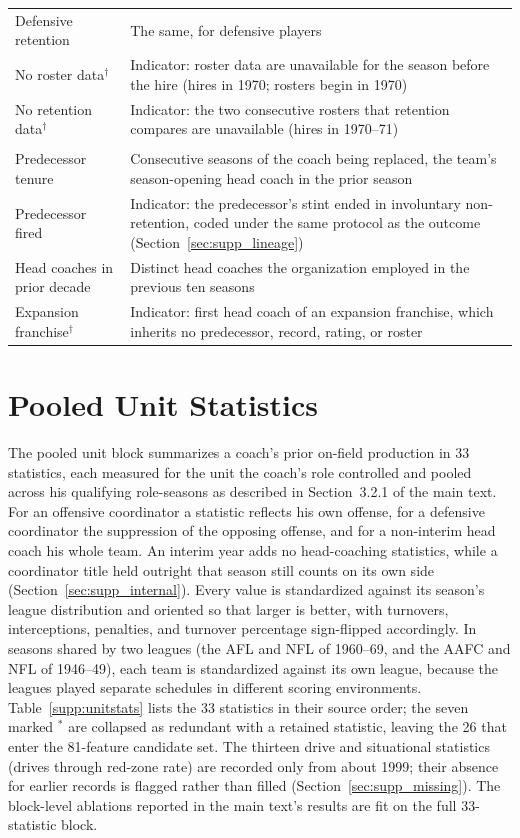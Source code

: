 \documentclass[12pt,USenglish]{article}
\begin{document}
{\begin{longtable}{@{}l p{8.8cm}@{}}
Defensive retention & The same, for defensive players \\
No roster data$^{\dagger}$ & Indicator: roster data are unavailable for the season before the hire (hires in 1970; rosters begin in 1970) \\
No retention data$^{\dagger}$ & Indicator: the two consecutive rosters that retention compares are unavailable (hires in 1970--71) \\
\addlinespace
\multicolumn{2}{@{}l}{\emph{Organizational instability (4)}}\\[2pt]
Predecessor tenure & Consecutive seasons of the coach being replaced, the team's season-opening head coach in the prior season \\
Predecessor fired & Indicator: the predecessor's stint ended in involuntary non-retention, coded under the same protocol as the outcome (Section~\ref{sec:supp_lineage}) \\
Head coaches in prior decade & Distinct head coaches the organization employed in the previous ten seasons \\
Expansion franchise$^{\dagger}$ & Indicator: first head coach of an expansion franchise, which inherits no predecessor, record, rating, or roster \\
\end{longtable}
}

\section{Pooled Unit Statistics}
\label{sec:supp_unitstats}

The pooled unit block summarizes a coach's prior on-field production in 33 statistics, each measured for the unit the coach's role controlled and pooled across his qualifying role-seasons as described in Section~3.2.1 of the main text. For an offensive coordinator a statistic reflects his own offense, for a defensive coordinator the suppression of the opposing offense, and for a non-interim head coach his whole team. An interim year adds no head-coaching statistics, while a coordinator title held outright that season still counts on its own side (Section~\ref{sec:supp_internal}). Every value is standardized against its season's league distribution and oriented so that larger is better, with turnovers, interceptions, penalties, and turnover percentage sign-flipped accordingly. In seasons shared by two leagues (the AFL and NFL of 1960--69, and the AAFC and NFL of 1946--49), each team is standardized against its own league, because the leagues played separate schedules in different scoring environments. Table~\ref{supp:unitstats} lists the 33 statistics in their source order; the seven marked $^{\ast}$ are collapsed as redundant with a retained statistic, leaving the 26 that enter the 81-feature candidate set. The thirteen drive and situational statistics (drives through red-zone rate) are recorded only from about 1999; their absence for earlier records is flagged rather than filled (Section~\ref{sec:supp_missing}). The block-level ablations reported in the main text's results are fit on the full 33-statistic block.
\end{document}
